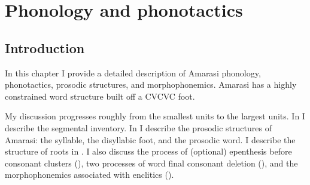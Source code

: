\chapter{Phonology and phonotactics}\label{ch:AmaPho}

\section{Introduction}
In this chapter I provide a detailed description of Amarasi
phonology, phonotactics, prosodic structures, and morphophonemics.
Amarasi has a highly constrained word structure built off a CVCVC foot.

My discussion progresses roughly from the
smallest units to the largest units.
In  I describe the segmental inventory.
In  I describe the prosodic structures
of Amarasi: the syllable, the disyllabic foot, and the prosodic word.
I describe the structure of roots in .
I also discuss the process of (optional) epenthesis
before consonant clusters (),
two processes of word final consonant deletion (),
and the morphophonemics associated with enclitics ().


	





	
	


	
	
	
	
	
	


	
	
		
	
	
	
	
	





%
